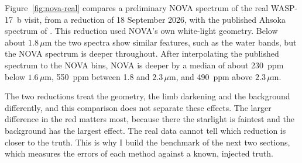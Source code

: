 Figure~\ref{fig:nova-real} compares a preliminary NOVA spectrum of the real
WASP-17~b visit, from a reduction of 18 September 2026, with the published
Ahsoka spectrum of \citet{LouieEtAl2025}. This reduction used NOVA's own
white-light geometry. Below about $1.8\,\mu\mathrm{m}$ the
two spectra show similar features, such as the water bands, but the NOVA
spectrum is deeper throughout. After interpolating the published spectrum to
the NOVA bins, NOVA is deeper by a median of about 230~ppm below
$1.6\,\mu\mathrm{m}$, 550~ppm between 1.8 and $2.3\,\mu\mathrm{m}$, and
490~ppm above $2.3\,\mu\mathrm{m}$.

The two reductions treat the geometry, the limb darkening and the background
differently, and this comparison does not separate these effects. The larger
difference in the red matters most, because there the starlight is faintest
and the background has the largest effect. The real data cannot tell which
reduction is closer to the truth. This is why I build the benchmark of the
next two sections, which measures the errors of each method against a known,
injected truth.
